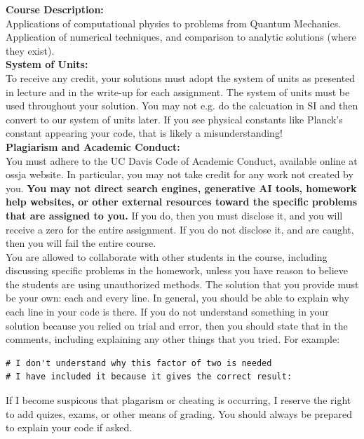 \documentclass[12pt]{article}
\begin{document}
\noindent
\textbf {Course Description:}\\
Applications of computational physics to problems from Quantum
Mechanics.  Application of numerical techniques, and comparison to
analytic solutions (where they exist).\\[8pt]

\noindent
\textbf {System of Units:}\\ To receive any credit, your solutions
must adopt the system of units as presented in lecture and in the
write-up for each assignment.  The system of units must be used
throughout your solution.  You may not e.g. do the calcuation in SI
and then convert to our system of units later.  If you see physical
constants like Planck's constant appearing your code, that is likely a
misunderstanding! \\[8pt]

\noindent
\textbf {Plagiarism and Academic Conduct:}\\
You must adhere to the UC Davis Code of Academic Conduct, available
online at ossja website. In particular, you may not take credit for
any work not created by you.  {\bf You may not direct search engines,
  generative AI tools, homework help websites, or other external
  resources toward the specific problems that are assigned to you.}
If you do, then you must disclose it, and you will receive a zero for
the entire assignment.  If you do not disclose it, and are caught,
then you will fail the entire course.\\[3pt]

\noindent
You are allowed to collaborate with other students in the course,
including discussing specific problems in the homework, unless you
have reason to believe the students are using unauthorized methods.
The solution that you provide must be your own: each and every line.
In general, you should be able to explain why each line in your code
is there.  If you do not understand something in your solution because
you relied on trial and error, then you should state that in the
comments, including explaining any other things that you tried.  For
example:
\begin{verbatim}
# I don't understand why this factor of two is needed
# I have included it because it gives the correct result:
\end{verbatim}

\noindent
If I become suspicous that plagarism or cheating is occurring, I
reserve the right to add quizes, exams, or other means of grading.
You should always be prepared to explain your code if asked.\\[3pt]
\end{document}
